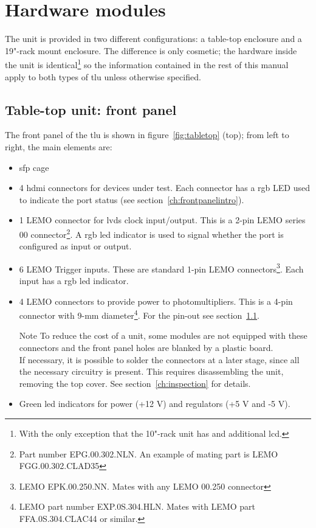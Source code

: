 \section{Hardware modules}\label{ch:hardwaretypes}
The unit is provided in two different configurations: a table-top enclosure and a 19"-rack mount enclosure. The difference is only cosmetic; the hardware inside the unit is identical\footnote{With the only exception that the 10"-rack unit has and additional \gls{lcd}.} so the information contained in the rest of this manual apply to both types of \gls{tlu} unless otherwise specified.

\subsection{Table-top unit: front panel}\label{ch:frontpanel}
The front panel of the \gls{tlu} is shown in figure~\ref{fig:tabletop} (top); from left to right, the main elements are:
\begin{itemize}
  \item \gls{sfp} cage
  \item 4 \gls{hdmi} connectors for devices under test. Each connector has a \gls{rgb} LED used to indicate the port status (see section~\ref{ch:frontpanelintro}).
  \item 1 LEMO connector for \gls{lvds} clock input/output. This is a 2-pin LEMO series 00 connector\footnote{Part number EPG.00.302.NLN. An example of mating part is LEMO FGG.00.302.CLAD35}. A \gls{rgb} \gls{led} indicator is used to signal whether the port is configured as input or output.
  \item 6 LEMO Trigger inputs. These are standard 1-pin LEMO connectors\footnote{LEMO EPK.00.250.NN. Mates with any LEMO 00.250 connector}. Each input has a \gls{rgb} \gls{led} indicator.
  \item 4 LEMO connectors to provide power to photomultipliers. This is a 4-pin connector with 9-mm diameter\footnote{LEMO part number EXP.0S.304.HLN. Mates with LEMO part FFA.0S.304.CLAC44 or similar.}. For the pin-out see section~\ref{ch:frontpanel}.
  \begin{alertinfo}{Note}
    To reduce the cost of a unit, some modules are not equipped with these connectors and the front panel holes are blanked by a plastic board.\\
    If necessary, it is possible to solder the connectors at a later stage, since all the necessary circuitry is present. This requires disassembling the unit, removing the top cover. See section~\ref{ch:inspection} for details.
  \end{alertinfo}
  \item Green \gls{led} indicators for power (+12 V) and regulators (+5 V and -5 V).
\end{itemize}
